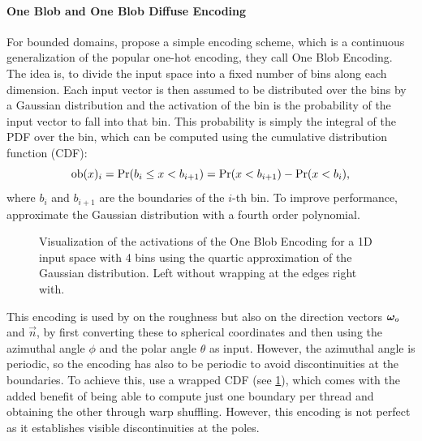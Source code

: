 \paragraph{One Blob and One Blob Diffuse Encoding}
For bounded domains, \textcite{muller2019} propose a simple encoding scheme, which is a continuous generalization of the popular one-hot encoding, they call One Blob Encoding.
The idea is, to divide the input space into a fixed number of bins along each dimension.
Each input vector is then assumed to be distributed over the bins by a Gaussian distribution and the activation of the bin is the probability of the input vector to fall into that bin.
This probability is simply the integral of the PDF over the bin, which can be computed using the cumulative distribution function (CDF):
\begin{equation}
    \mathrm{ob}(x)_i = \mathrm{Pr}(b_i \leq x < b_{i+1}) = \mathrm{Pr}(x < b_{i+1}) - \mathrm{Pr}(x < b_i),
\end{equation}
where $b_i$ and $b_{i+1}$ are the boundaries of the $i$-th bin.
To improve performance, \textcite{muller2021} approximate the Gaussian distribution with a fourth order polynomial.

\begin{figure}[htb!]
    \centering
    \begin{subfigure}{0.5\textwidth}
        \centering
        
    \end{subfigure}%
    \begin{subfigure}{0.5\textwidth}
        \centering
        
    \end{subfigure}
    \caption{Visualization of the activations of the One Blob Encoding for a 1D input space with 4 bins using the quartic approximation of the Gaussian distribution. Left without wrapping at the edges right with.}
    \label{fig:oneblob}
\end{figure}

This encoding is used by \textcite{muller2021} on the roughness but also on the direction vectors ${\bm{\omega}_o}$ and $\vec{n}$, by first converting these to spherical coordinates and then using the azimuthal angle $\phi$ and the polar angle $\theta$ as input.
However, the azimuthal angle is periodic, so the encoding has also to be periodic to avoid discontinuities at the boundaries.
To achieve this, \textcite{muller2021} use a wrapped CDF (see \cref{fig:oneblob}), which comes with the added benefit of being able to compute just one boundary per thread and obtaining the other through warp shuffling.
However, this encoding is not perfect as it establishes visible discontinuities at the poles.

